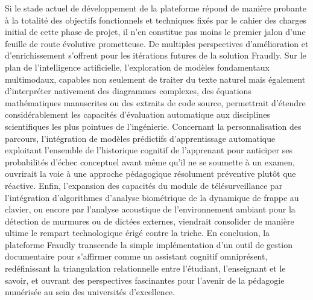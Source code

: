 Si le stade actuel de développement de la plateforme répond de manière probante à la totalité des objectifs fonctionnels et techniques fixés par le cahier des charges initial de cette phase de projet, il n'en constitue pas moins le premier jalon d'une feuille de route évolutive prometteuse. De multiples perspectives d'amélioration et d'enrichissement s'offrent pour les itérations futures de la solution Fraudly. Sur le plan de l'intelligence artificielle, l'exploration de modèles fondamentaux multimodaux, capables non seulement de traiter du texte naturel mais également d'interpréter nativement des diagrammes complexes, des équations mathématiques manuscrites ou des extraits de code source, permettrait d'étendre considérablement les capacités d'évaluation automatique aux disciplines scientifiques les plus pointues de l'ingénierie. Concernant la personnalisation des parcours, l'intégration de modèles prédictifs d'apprentissage automatique exploitant l'ensemble de l'historique cognitif de l'apprenant pour anticiper ses probabilités d'échec conceptuel avant même qu'il ne se soumette à un examen, ouvrirait la voie à une approche pédagogique résolument préventive plutôt que réactive. Enfin, l'expansion des capacités du module de télésurveillance par l'intégration d'algorithmes d'analyse biométrique de la dynamique de frappe au clavier, ou encore par l'analyse acoustique de l'environnement ambiant pour la détection de murmures ou de dictées externes, viendrait consolider de manière ultime le rempart technologique érigé contre la triche. En conclusion, la plateforme Fraudly transcende la simple implémentation d'un outil de gestion documentaire pour s'affirmer comme un assistant cognitif omniprésent, redéfinissant la triangulation relationnelle entre l'étudiant, l'enseignant et le savoir, et ouvrant des perspectives fascinantes pour l'avenir de la pédagogie numérisée au sein des universités d'excellence.
